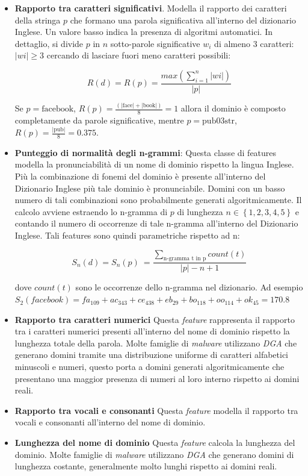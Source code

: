 \begin{itemize}

\item \textbf{Rapporto tra caratteri significativi}. Modella il rapporto dei caratteri della stringa $p$ che formano una parola significativa all'interno del dizionario Inglese. Un valore basso indica la presenza di algoritmi automatici. In dettaglio, si divide $p$ in $n$ sotto-parole significative $w_i$ di almeno $3$ caratteri: $|wi| \ge 3$ cercando di lasciare fuori meno caratteri possibili: 

\[R(d) = R(p) = \frac{max(\sum_{i=1}^n |wi|)}{\left | p \right |}\] 

Se $p = \text{facebook}$, $R(p) = \frac{(|\text{face}| + |\text{book}|)}{8} = 1$ allora il dominio è composto completamente da parole significative, mentre $p = \text{pub03str}$, $R(p) = \frac{|\text{pub}|}{8} = 0.375$. 

    

\item \textbf{Punteggio di normalità degli n-grammi}: Questa classe di features modella la pronunciabilità di un nome di dominio rispetto la lingua Inglese. Più la combinazione di fonemi del dominio è presente  all'interno del Dizionario Inglese più tale dominio è pronunciabile. Domini con un basso numero di tali combinazioni sono probabilmente generati algoritmicamente. Il calcolo avviene estraendo lo n-gramma di $p$ di lunghezza $n \in \left \{1, 2, 3, 4, 5 \right \}$ e contando il numero di occorrenze di tale n-gramma all'interno del Dizionario Inglese. Tali features sono quindi parametriche rispetto ad n:
 
\[S_n(d) = S_n(p) \:= \frac{\sum_{\text{n-gramma t in p}} count(t)}{\left | p \right | - n + 1}\] 

dove $count(t)$ sono le occorrenze dello n-gramma nel dizionario. Ad esempio $S_2(facebook) = fa_{109} + ac_{343} + ce_{438} + eb_{29} + bo_{118} + oo_{114} + ok_{45} = 170.8$

       
\item \textbf{Rapporto tra caratteri numerici} Questa \textit{feature} rappresenta il rapporto tra i caratteri numerici presenti all'interno del nome di dominio rispetto la lunghezza totale della parola. Molte famiglie di \textit{malware} utilizzano \textit{DGA} che generano domini tramite una distribuzione uniforme di caratteri alfabetici minuscoli e numeri, questo porta a domini generati algoritmicamente che presentano una maggior presenza di numeri al loro interno rispetto ai domini reali.


\item \textbf{Rapporto tra vocali e consonanti} Questa \textit{feature} modella il rapporto tra vocali e consonanti all'interno del nome di dominio.


\item \textbf{Lunghezza del nome di dominio} Questa \textit{feature} calcola la lunghezza del dominio. Molte famiglie di \textit{malware} utilizzano \textit{DGA} che generano domini di lunghezza costante, generalmente molto lunghi rispetto ai domini reali.
	
\end{itemize}

